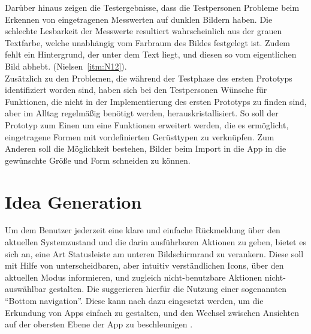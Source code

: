 Darüber hinaus zeigen die Testergebnisse, dass die Testpersonen Probleme beim Erkennen von eingetragenen Messwerten auf dunklen Bildern haben.
Die schlechte Lesbarkeit der Messwerte resultiert wahrscheinlich aus der grauen Textfarbe, welche unabhängig vom Farbraum des Bildes festgelegt ist.
Zudem fehlt ein Hintergrund, der unter dem Text liegt, und diesen so vom eigentlichen Bild abhebt.
(Nielsen~\autoref{itm:N12}). \\

Zusätzlich zu den Problemen, die während der Testphase des ersten Prototyps identifiziert worden sind, haben sich bei den Testpersonen Wünsche für Funktionen, die nicht in der Implementierung des ersten Prototyps zu finden sind, aber im Alltag regelmäßig benötigt werden, herauskristallisiert. 
So soll der Prototyp zum Einen um eine Funktionen erweitert werden, die es ermöglicht, eingetragene Formen mit vordefinierten Gerüsttypen zu verknüpfen.
Zum Anderen soll die Möglichkeit bestehen, Bilder beim Import in die App in die gewünschte Größe und Form schneiden zu können.

\section{Idea Generation}\label{sec:idea2}
Um dem Benutzer jederzeit eine klare und einfache Rückmeldung über den aktuellen Systemzustand und die darin ausführbaren Aktionen zu geben, bietet es sich an, eine Art Statusleiste am unteren Bildschirmrand zu verankern.
Diese soll mit Hilfe von unterscheidbaren, aber intuitiv verständlichen Icons, über den aktuellen Modus informieren, und zugleich nicht-benutzbare Aktionen nicht-auswählbar gestalten.
Die \mg{} suggerieren hierfür die Nutzung einer sogenannten ``Bottom navigation''.
Diese kann nach \citeauthor{BN18} dazu eingesetzt werden, um die Erkundung von Apps einfach zu gestalten, und den Wechsel zwischen Ansichten auf der obersten Ebene der App zu beschleunigen \citep{BN18}. \\

